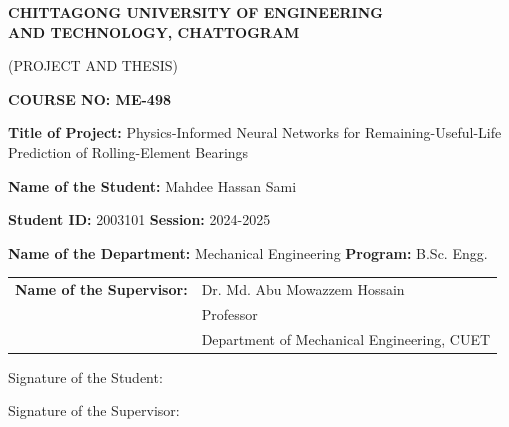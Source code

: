 \begin{titlepage}
\begin{center}
    \textbf{\large CHITTAGONG UNIVERSITY OF ENGINEERING \\ AND TECHNOLOGY, CHATTOGRAM}

    \vspace{0.5em}

    (PROJECT AND THESIS)

    \vspace{0.5em}

    \textbf{COURSE NO: ME-498}
\end{center}

\vspace{1.5cm}

\noindent
\textbf{Title of Project:} Physics-Informed Neural Networks for Remaining-Useful-Life Prediction of Rolling-Element Bearings

\vspace{1.2cm}

\noindent
\textbf{Name of the Student:} Mahdee Hassan Sami

\vspace{1.2cm}

\noindent
\textbf{Student ID:} 2003101 \hfill \textbf{Session:} 2024-2025

\vspace{1.2cm}

\noindent
\textbf{Name of the Department:} Mechanical Engineering \hfill \textbf{Program:} B.Sc. Engg.

\vspace{1.2cm}

\noindent
\begin{tabular}{@{}ll}
    \textbf{Name of the Supervisor:} & Dr. Md. Abu Mowazzem Hossain \\
                                     & Professor \\
                                     & Department of Mechanical Engineering, CUET
\end{tabular}

\vspace{3.0cm}

\noindent
\begin{minipage}[t]{0.45\textwidth}
    \raggedright
    Signature of the Student:
\end{minipage}
\hfill
\begin{minipage}[t]{0.45\textwidth}
    \raggedleft
    Signature of the Supervisor:
\end{minipage}
\end{titlepage}

